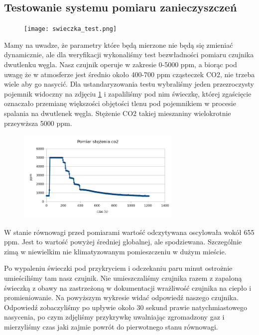 \documentclass[a4paper,12pt]{article}
\begin{document}
\subsection{Testowanie systemu pomiaru zanieczyszczeń}

\begin{figure}[H]
\texttt{[image: swieczka\_test.png]}
\centering{}
\label{swieczka}
\end{figure}

Mamy na uwadze, że parametry które będą mierzone nie będą się zmieniać dynamicznie, ale dla weryfikacji wykonaliśmy test bezwładności pomiaru czujnika dwutlenku węgla. Nasz czujnik operuje w zakresie 0-5000 ppm, a biorąc pod uwagę że w atmosferze jest średnio około 400-700 ppm cząsteczek CO2, nie trzeba wiele aby go nasycić. Dla ustandaryzowania testu wybraliśmy jeden przezroczysty pojemnik widoczny na zdjęciu \ref{swieczka} i zapaliliśmy pod nim świeczkę, której zgaścięcie oznaczało przemianę większości objętości tlenu pod pojemnikiem w procesie spalania na dwutlenek węgla. Stężenie CO2 takiej mieszaniny wielokrotnie przeywższa 5000 ppm. 

\begin{figure}[H]
\includegraphics[width=0.7\textwidth]{co2.png}
\centering{}
\end{figure}

W stanie równowagi przed pomiarami wartość odczytywana oscylowała wokół 655 ppm. Jest to wartość powyżej średniej globalnej, ale spodziewana. Szczególnie zimą w niewielkim nie klimatyzowanym pomieszczeniu w dużym mieście.

Po wypaleniu świeczki pod przykryciem i odczekaniu paru minut ostrożnie umieściliśmy tam nasz czujnik. Nie umieszczaliśmy czujnika razem z zapaloną świeczką z obawy na zastrzeżoną w dokumentacji wrażliwość czujnika na ciepło i promieniowanie. Na powyższym wykresie widać odpowiedź naszego czujnika. Odpowiedź zobaczyliśmy po upływie około 30 sekund prawie natychmiastowego nasycenia, po czym zdjęliśmy przykrywkę uwalniając zgromadzony gaz i mierzyliśmy czas jaki zajmie powrót do pierwotnego stanu równowagi.
\end{document}
